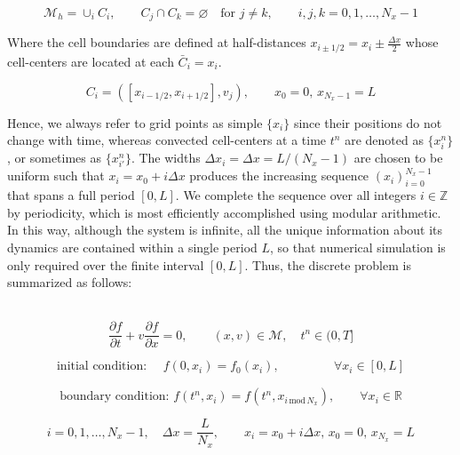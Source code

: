 \documentclass[11pt,titlepage]{report}
\begin{document}
$$\mathcal{M}_h = \cup_i C_i , \qquad C_j \cap C_k = \varnothing \quad \textrm{for } j \neq k, \qquad i,j,k = 0, 1, \ldots , N_x - 1$$

\noindent Where the cell boundaries are defined at half-distances $x_{i\pm 1/2} = x_i \pm \tfrac{\Delta x}{2}$ whose cell-centers are located at each $\bar{C}_i = x_i$.

 $$C_i = ([x_{i-1/2},x_{i+1/2}],v_j), \qquad x_0 = 0, \, x_{N_x-1} = L$$

\noindent Hence, we always refer to grid points as simple $\{x_i\}$ since their positions do not change with time, whereas convected cell-centers at a time $t^n$ are denoted as $\{x_{i}^n\}$, or sometimes as $\{x_{i'}^n\}$. The widths $\Delta x_i = \Delta x = L / (N_x - 1)$ are chosen to be uniform such that $x_i = x_0 + i\Delta x$ produces the increasing sequence $(x_i)_{i = 0}^{N_x-1}$ that spans a full period $[0,L]$. We complete the sequence over all integers $i\in\mathbb{Z}$ by periodicity, which is most efficiently accomplished using modular arithmetic. In this way, although the system is infinite, all the unique information about its dynamics are contained within a single period $L$, so that numerical simulation is only required over the finite interval $[0,L]$. Thus, the discrete problem is summarized as follows:

\vspace{1em}
\\[.5em]

\begin{equation}
\frac{\partial f}{\partial t} + v\frac{\partial f}{\partial x} = 0 \label{eq:Advection_1D} , \qquad (x,v)\in\mathcal{M}, \quad t^n \in (0,T]
\end{equation}

\begin{equation}
\textrm{initial condition: } \quad f(0,x_i) = f_0(x_i),\phantom{_{\mathrm{mod}\, N_x}} \qquad \forall x_i\in [0,L]
\end{equation}

\begin{equation}
\textrm{boundary condition: } f(t^n,x_i) = f(t^n,x_{i\,\mathrm{mod}\, N_x}), \qquad \forall x_i\in\mathbb{R}
\end{equation}

\begin{equation}
i = 0,1,\ldots , N_x-1, \quad \Delta x = \frac{L}{N_x}, \qquad x_i = x_0 + i\Delta x , \, x_0 = 0, \, x_{N_x} = L
\end{equation}
\end{document}
